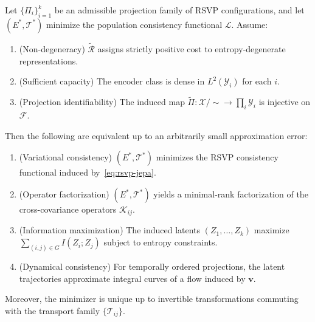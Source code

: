 \documentclass[12pt, oneside]{article}
\begin{document}
\begin{theorem}
\label{thm:unified}
Let $\{\Pi_i\}_{i=1}^k$ be an admissible projection family of RSVP configurations, and let $(E^*, \mathcal{T}^*)$ minimize the population consistency functional $\mathcal{L}$. Assume:

\begin{enumerate}
\item (Non-degeneracy) $\widetilde{\mathcal{R}}$ assigns strictly positive cost to entropy-degenerate representations.
\item (Sufficient capacity) The encoder class is dense in $L^2(\mathcal{Y}_i)$ for each $i$.
\item (Projection identifiability) The induced map $\widetilde{\Pi} : \mathcal{X}/\sim \to \prod_i \mathcal{Y}_i$ is injective on $\mathcal{F}$.
\end{enumerate}

Then the following are equivalent up to an arbitrarily small approximation error:

\begin{enumerate}
\item (Variational consistency) $(E^*, \mathcal{T}^*)$ minimizes the RSVP consistency functional induced by~\eqref{eq:rsvp-jepa}.
\item (Operator factorization) $(E^*, \mathcal{T}^*)$ yields a minimal-rank factorization of the cross-covariance operators $\mathcal{K}_{ij}$.
\item (Information maximization) The induced latents $(Z_1,\dots,Z_k)$ maximize $\sum_{(i,j)\in G} I(Z_i; Z_j)$ subject to entropy constraints.
\item (Dynamical consistency) For temporally ordered projections, the latent trajectories approximate integral curves of a flow induced by $\mathbf{v}$.
\end{enumerate}

Moreover, the minimizer is unique up to invertible transformations commuting with the transport family $\{\mathcal{T}_{ij}\}$.
\end{theorem}
\end{document}
